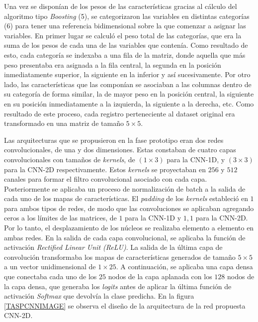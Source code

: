 Una vez se disponían de los pesos de las características gracias al cálculo del algoritmo tipo \textit{Boosting} (5), se categorizaron las variables en distintas categorías (6) para tener una referencia bidimensional sobre la que comenzar a asignar las variables. En primer lugar se calculó el peso total de las categorías, que era la suma de los pesos de cada una de las variables que contenía. Como resultado de esto, cada categoría se indexaba a una fila de la matriz, donde aquella que más peso presentaba era asignada a la fila central, la segunda en la posición inmediatamente superior, la siguiente en la inferior y así sucesivamente. Por otro lado, las características que las componían se asociaban a las columnas dentro de su categoría de forma similar, la de mayor peso en la posición central, la siguiente en su posición inmediatamente a la izquierda, la siguiente a la derecha, etc. Como resultado de este proceso, cada registro perteneciente al dataset original era transformado en una matriz de tamaño $5\times5$.

Las arquitecturas que se propusieron en la fase prototipo eran dos redes convolucionales, de una y dos dimensiones. Estas constaban de cuatro capas convolucionales con tamaños de \textit{kernels}, de $(1 \times 3)$ para la CNN-1D, y $(3 \times 3)$ para la CNN-2D respectivamente. Estos \textit{kernels} se proyectaban en $256$ y $512$ canales para formar el filtro convolucional asociado con cada capa. Posteriormente se aplicaba un proceso de normalización de batch a la salida de cada uno de los mapas de características. El \textit{padding} de los \textit{kernels} estableció en $1$ para ambos tipos de redes, de modo que las convoluciones se aplicaban agregando ceros a los límites de las matrices, de $1$ para la CNN-1D y ${1, 1}$ para la CNN-2D. Por lo tanto, el desplazamiento de los núcleos se realizaba elemento a elemento en ambas redes. En la salida de cada capa convolucional, se aplicaba la función de activación \textit{Rectified Linear Unit (ReLU)}. La salida de la última capa de convolución transformaba los mapas de características generados de tamaño $5 \times 5$ a un vector unidimensional de $1 \times 25$. A continuación, se aplicaba una capa densa que conectaba cada uno de los $25$ nodos de la capa aplanada con los $128$ nodos de la capa densa, que generaba los \textit{logits} antes de aplicar la última función de activación \textit{Softmax} que devolvía la clase predicha. En la figura \ref{TASPCNNIMAGE} se observa el diseño de la arquitectura de la red propuesta CNN-2D.

